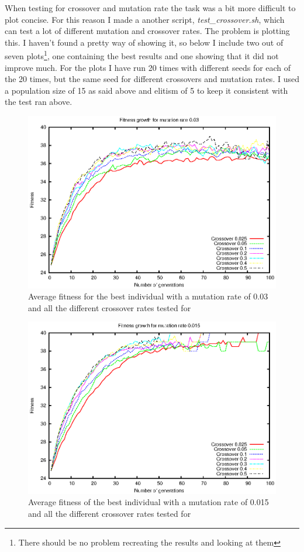 When testing for crossover and mutation rate the task was a bit more difficult
to plot concise. For this reason I made a another script,
\textit{test\_crossover.sh}, which can test a lot of different mutation and
crossover rates. The problem is plotting this. I haven't found a pretty way of
showing it, so below I include two out of seven plots\footnote{There should be
no problem recreating the results and looking at them}, one containing the best
results and one showing that it did not improve much. For the plots I have run
20 times with different seeds for each of the 20 times, but the same seed for
different crossovers and mutation rates. I used a population size of 15 as said
above and elitism of 5 to keep it consistent with the test ran above.

\begin{figure}[h!]
	\includegraphics{../graphs/fitness_crossover_mute_003_average.eps}
	\caption{Average fitness for the best individual with a mutation rate of 0.03 and all the
	different crossover rates tested for}
	\label{fig:cross 0.03}
\end{figure}

\begin{figure}[h!]
	\includegraphics{../graphs/fitness_crossover_mute_0015_average.eps}
	\caption{Average fitness of the best individual with a mutation rate of 0.015 and all the
	different crossover rates tested for}
	\label{fig:cross 0.015}
\end{figure}

